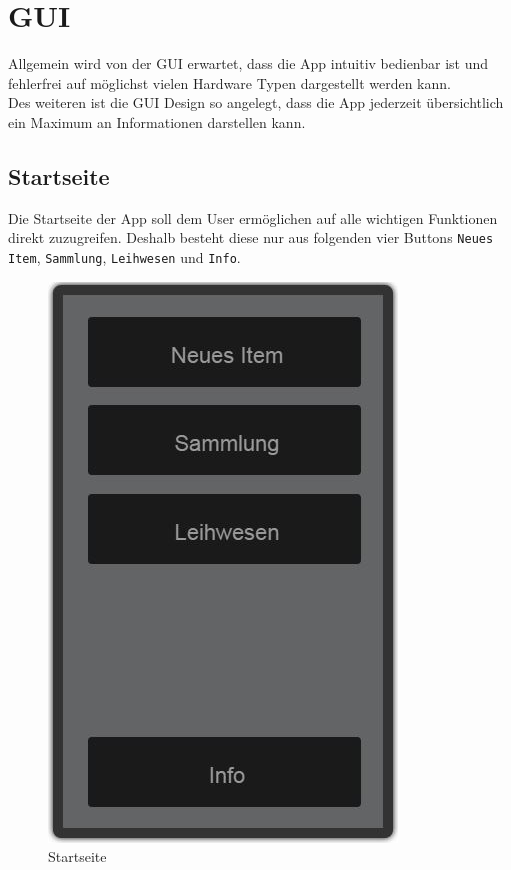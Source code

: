 \section{GUI}
\label{sec:GUI}

Allgemein wird von der GUI erwartet, dass die App intuitiv bedienbar ist und fehlerfrei auf möglichst vielen Hardware Typen dargestellt werden kann. \\

Des weiteren ist die GUI  Design so angelegt, dass die App jederzeit übersichtlich ein Maximum an Informationen darstellen kann.

\subsection{Startseite}
\label{subsec:Startseite}

Die Startseite der App soll dem User ermöglichen auf alle wichtigen Funktionen direkt zuzugreifen. Deshalb besteht diese nur aus folgenden vier Buttons {\color{IndianRed}\texttt{Neues Item}}, {\color{IndianRed}\texttt{Sammlung}}, {\color{IndianRed}\texttt{Leihwesen}} und {\color{IndianRed}\texttt{Info}}.

\begin{figure}[htbp]
	\centering
	\includegraphics[scale=0.5]{pic/GUI/Main}
	\caption{Startseite}
\end{figure}

